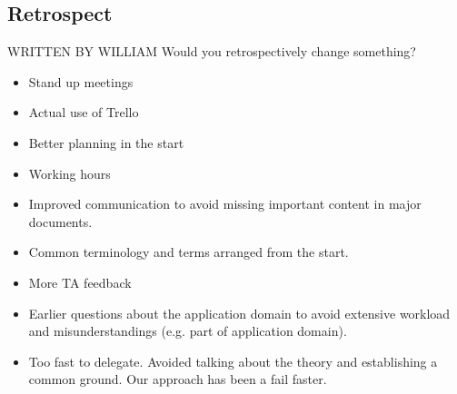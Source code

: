 \subsection{Retrospect}
WRITTEN BY WILLIAM 
Would you retrospectively change something?

\begin{itemize}
	\item Stand up meetings
	\item Actual use of Trello
	\item Better planning in the start
	\item Working hours 
	\item Improved communication to avoid missing important content in major documents.
	\item Common terminology and terms arranged from the start. 
	\item More TA feedback 
	\item Earlier questions about the application domain to avoid extensive workload and misunderstandings (e.g. part of application domain). 
	\item Too fast to delegate. Avoided talking about the theory and establishing a common ground. Our approach has been a fail faster.
\end{itemize}
